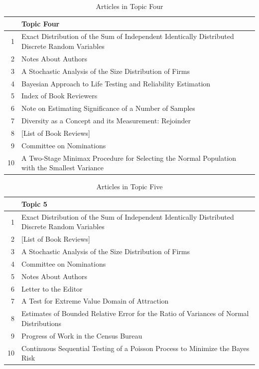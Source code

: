 \documentclass{article}%
\theoremstyle{definition}
\begin{document}
\begin{table}[ht]
\centering
\caption{Articles in Topic Four}
\begin{tabular}{rl}
  \hline
 & Topic Four \\ 
  \hline
1 & Exact Distribution of the Sum of Independent Identically Distributed Discrete Random Variables \\ 
  2 & Notes About Authors \\ 
  3 &  A Stochastic Analysis of the Size Distribution of Firms \\ 
  4 &  Bayesian Approach to Life Testing and Reliability Estimation \\ 
  5 & Index of Book Reviewers \\ 
  6 & Note on Estimating Significance of a Number of Samples \\ 
  7 & Diversity as a Concept and its Measurement: Rejoinder \\ 
  8 & [List of Book Reviews] \\ 
  9 & Committee on Nominations \\ 
  10 & A Two-Stage Minimax Procedure for Selecting the Normal Population with the Smallest Variance \\ 
   \hline
\end{tabular}
\end{table}



\begin{table}[ht]
\centering
\caption{Articles in Topic Five}
\begin{tabular}{rl}
  \hline
 & Topic 5 \\ 
  \hline
1 &  Exact Distribution of the Sum of Independent Identically Distributed Discrete Random Variables \\ 
  2 & [List of Book Reviews] \\ 
  3 &  A Stochastic Analysis of the Size Distribution of Firms \\ 
  4 & Committee on Nominations \\ 
  5 & Notes About Authors \\ 
  6 & Letter to the Editor \\ 
  7 & A Test for Extreme Value Domain of Attraction \\ 
  8 & Estimates of Bounded Relative Error for the Ratio of Variances of Normal Distributions \\ 
  9 & Progress of Work in the Census Bureau \\ 
  10 & Continuous Sequential Testing of a Poisson Process to Minimize the Bayes Risk \\ 
   \hline
\end{tabular}
\end{table}
\end{document}
